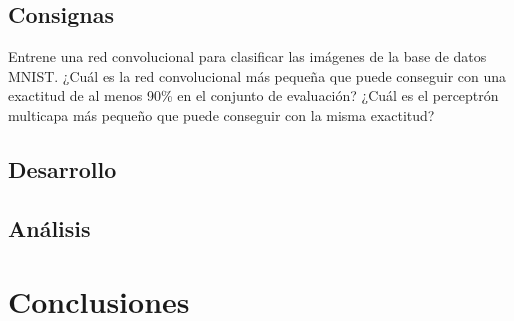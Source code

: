 \documentclass[11pt]{article} %
\begin{document}
\subsection{Consignas}

Entrene una red convolucional para clasificar las imágenes de la base de datos MNIST.
¿Cuál es la red convolucional más pequeña que puede conseguir con una exactitud de al menos 90\% en el conjunto de evaluación? ¿Cuál es el perceptrón multicapa más pequeño que puede conseguir con la misma exactitud?

\subsection{Desarrollo}

\subsection{Análisis}





\section{Conclusiones}
\end{document}
